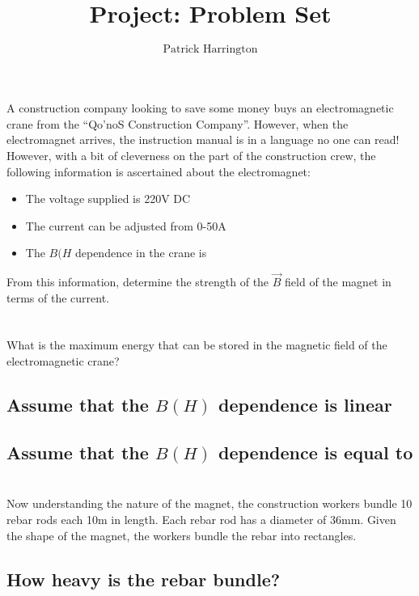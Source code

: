 \documentclass{./cls/hw}
\title{Project: Problem Set}
\author{$\boxed{\text{Patrick Harrington}}$}
\begin{document}
\maketitle
\section{} 
A construction company looking to save some money buys an
electromagnetic crane from the ``Qo'noS Construction Company''. However, when the electromagnet arrives, the
instruction manual is in a language no one can read! However, with a bit of
cleverness on the part of the construction crew, the following information is
ascertained about the electromagnet:

\begin{itemize}
  \item The voltage supplied is 220V DC
  \item The current can be adjusted from 0-50A
  \item The ${B(H}$ dependence in the crane is 
\end{itemize}

From this information, determine the strength of the $\vec{B}$ field of the
magnet in terms of the current.

\section{}
What is the maximum energy that can be stored in the magnetic field of the
electromagnetic crane? 

\subsection{Assume that the $B(H)$ dependence is linear}
\subsection{Assume that the $B(H)$ dependence is equal to}

\section{}
Now understanding the nature of the magnet, the construction workers bundle 10
rebar rods each 10m in length. Each rebar rod has a diameter of 36mm. Given
the shape of the magnet, the workers bundle the rebar into rectangles.

\subsection{How heavy is the rebar bundle?}
\end{document}
